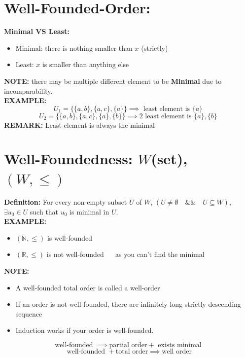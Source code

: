 \documentclass [9 pt]{article}
\theoremstyle{definition}
\begin{document}
\section*{Well-Founded-Order:}
\textbf{Minimal VS Least:}
\begin{itemize}
	\item Minimal: there is nothing smaller than $x$ (strictly)
	\item Least: $x$ is smaller than anything else 
\end{itemize}
\textbf{NOTE:} there may be multiple different element to be \textbf{Minimal} due to incomparability.\\
\newline
\textbf{EXAMPLE:} \\
$$U_1 = \{ \{ a, b \}, \{ a, c \} , \{ a\} \} \implies \text{ least element is } \{ a \}$$
$$U_2 = \{ \{ a, b \}, \{ a, c \} , \{ a\}, \{ b \} \} \implies \text{2 least element is } \{ a \}, \{ b \}$$
\newline
\textbf{REMARK:} Least element is always the minimal\\
\newline
\section*{Well-Foundedness: $W$(set), $(W, \leq)$ }
\textbf{Definition: } For every non-empty subset $U$ of $W$, $(U \neq \emptyset \quad \&\&\quad U \subseteq W)$, $\exists u_0 \in U $ such that $u_0$ is minimal in $U$.\\
\newline
\textbf{EXAMPLE:} 
\begin{itemize}
	\item $(\mathbb{N}, \leq)$ is well-founded\\
	\item $(\mathbb{R}, \leq)$ is not well-founded $\quad$  as you can't find the minimal \\
\end{itemize}
\newpage
\textbf{NOTE:}
\begin{itemize}
	\item A well-founded total order is called a well-order\\
	\item If an order is not well-founded, there are infinitely long strictly descending sequence\\
	\item Induction works if your order is well-founded.
\end{itemize}
$$ \text{ well-founded } \implies \text{partial order} + \text{ exists minimal  } $$
$$ \text{ well-founded } + \text{total order} \implies \text{well order} $$
\end{document}

